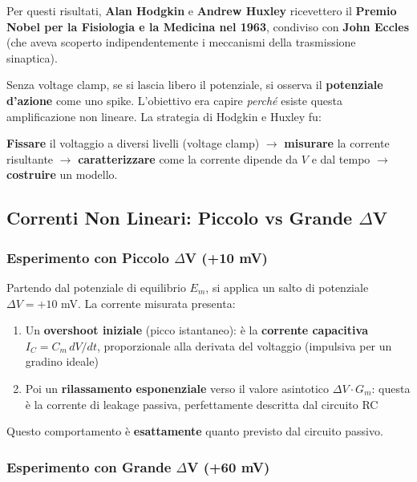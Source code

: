 Per questi risultati, \textbf{Alan Hodgkin} e \textbf{Andrew Huxley} ricevettero il \textbf{Premio Nobel per la Fisiologia e la Medicina nel 1963}, condiviso con \textbf{John Eccles} (che aveva scoperto indipendentemente i meccanismi della trasmissione sinaptica).


\vspace{0.3 cm}


\noindent Senza voltage clamp, se si lascia libero il potenziale, si osserva il \textbf{potenziale d'azione} come uno spike. L'obiettivo era capire \textit{perché} esiste questa amplificazione non lineare. La strategia di Hodgkin e Huxley fu:

\textbf{Fissare} il voltaggio a diversi livelli (voltage clamp) $\rightarrow$ \textbf{misurare} la corrente risultante $\rightarrow$ \textbf{caratterizzare} come la corrente dipende da $V$ e dal tempo $\rightarrow$ \textbf{costruire} un modello.

\subsection{Correnti Non Lineari: Piccolo vs Grande $\Delta$V}

\subsubsection{Esperimento con Piccolo $\Delta$V (+10 mV)}

Partendo dal potenziale di equilibrio $E_m$, si applica un salto di potenziale $\Delta V = +10$ mV. La corrente misurata presenta:

\begin{enumerate}
    \item Un \textbf{overshoot iniziale} (picco istantaneo): è la \textbf{corrente capacitiva} $I_C = C_m \, dV/dt$, proporzionale alla derivata del voltaggio (impulsiva per un gradino ideale)
    \item Poi un \textbf{rilassamento esponenziale} verso il valore asintotico $\Delta V \cdot G_m$: questa è la corrente di leakage passiva, perfettamente descritta dal circuito RC
\end{enumerate}

Questo comportamento è \textbf{esattamente} quanto previsto dal circuito passivo.

\subsubsection{Esperimento con Grande $\Delta$V (+60 mV)}

